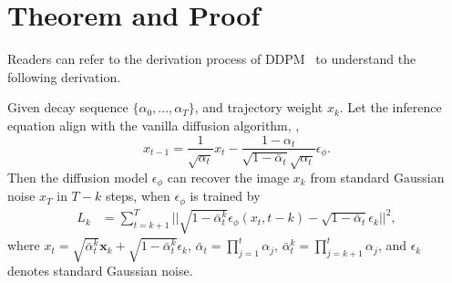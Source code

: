 \clearpage
\setcounter{page}{1}
\setcounter{theorem}{0}
\setcounter{assumption}{0}
\setcounter{equation}{0}
\setcounter{section}{0}

\clearpage
\appendix
\section{Theorem and Proof}\label{sec:appendix_1}
Readers can refer to the derivation process of DDPM~\cite{understand_DDPM} to understand the following derivation.
\begin{theorem}\label{the:L_k}
Given decay sequence $\{\alpha_0,...,\alpha_T\}$, and trajectory weight $x_k$. Let the inference equation align with the vanilla diffusion algorithm, \ie, 
\begin{equation}\label{eq:DDPM_inference}
x_{t-1}=\frac{1}{\sqrt{\alpha_t}}x_t - \frac{1 - \alpha_t}{\sqrt{1 - \bar{\alpha}_t} \sqrt{\alpha_t}}\epsilon_{\phi}.
\end{equation}
Then the diffusion model $\epsilon_{\phi}$ can recover the image $x_k$ from standard Gaussian noise $x_T$ in $T-k$ steps, when $\epsilon_{\phi}$ is trained by
\begin{align*}
L_k&=\sum_{t=k+1}^T||\sqrt{1-\bar{\alpha}_t^k}\epsilon_{\phi}(x_t, t-k)-\sqrt{1-\bar{\alpha}_t}\epsilon_k||^2,
\end{align*}
where $x_t=\sqrt{\bar{\alpha}^k_t} \mathbf{x}_k + \sqrt{1 - \bar{\alpha}^k_t}\epsilon_k$, $\bar{\alpha}_t=\prod_{j=1}^t \alpha_j$,  $\bar{\alpha}^k_t=\prod_{j=k+1}^t \alpha_j$, and $\epsilon_k$ denotes standard Gaussian noise.
\end{theorem}



